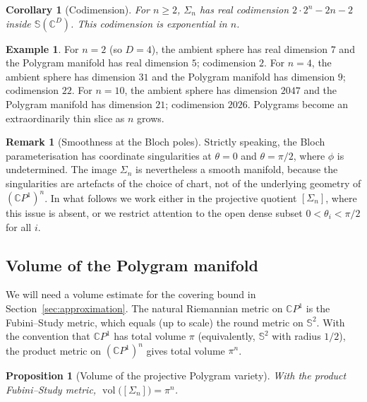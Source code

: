 \documentclass[11pt,letterpaper]{article}
\newtheorem{proposition}[theorem]{Proposition}
\newtheorem{corollary}[theorem]{Corollary}
\theoremstyle{definition}
\newtheorem{example}[theorem]{Example}
\newtheorem{remark}[theorem]{Remark}
\newcommand{\C}{\mathbb{C}}
\newcommand{\Sphere}{\mathbb{S}}
\newcommand{\vol}{\operatorname{vol}}
\begin{document}
\begin{corollary}[Codimension]
\label{cor:codim}
For $n \geq 2$, $\Sigma_{n}$ has real codimension $2 \cdot 2^{n} - 2n - 2$
inside $\Sphere(\C^{D})$. This codimension is exponential in $n$.
\end{corollary}

\begin{example}
For $n = 2$ (so $D = 4$), the ambient sphere has real dimension $7$ and the
Polygram manifold has real dimension $5$; codimension $2$. For $n = 4$, the
ambient sphere has dimension $31$ and the Polygram manifold has dimension $9$;
codimension $22$. For $n = 10$, the ambient sphere has dimension $2047$ and the
Polygram manifold has dimension $21$; codimension $2026$. Polygrams become an
extraordinarily thin slice as $n$ grows.
\end{example}

\begin{remark}[Smoothness at the Bloch poles]
\label{rem:smoothness}
Strictly speaking, the Bloch parameterisation has coordinate singularities at
$\theta = 0$ and $\theta = \pi/2$, where $\phi$ is undetermined. The image
$\Sigma_{n}$ is nevertheless a smooth manifold, because the singularities are
artefacts of the choice of chart, not of the underlying geometry of
$(\C P^{1})^{n}$. In what follows we work either in the projective quotient
$[\Sigma_{n}]$, where this issue is absent, or we restrict attention to the
open dense subset $0 < \theta_{i} < \pi/2$ for all $i$.
\end{remark}

\subsection{Volume of the Polygram manifold}

We will need a volume estimate for the covering bound in
Section~\ref{sec:approximation}. The natural Riemannian metric on $\C P^{1}$ is
the Fubini--Study metric, which equals (up to scale) the round metric on
$\Sphere^{2}$. With the convention that $\C P^{1}$ has total volume $\pi$
(equivalently, $\Sphere^{2}$ with radius $1/2$), the product metric on
$(\C P^{1})^{n}$ gives total volume $\pi^{n}$.

\begin{proposition}[Volume of the projective Polygram variety]
\label{prop:volume}
With the product Fubini--Study metric, $\vol\!\big([\Sigma_{n}]\big) = \pi^{n}$.
\end{proposition}
\end{document}
